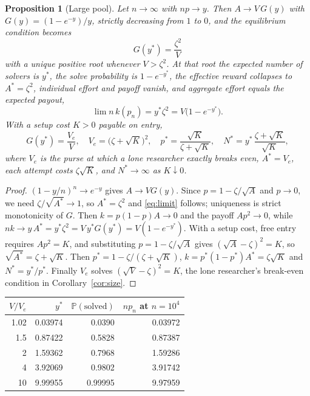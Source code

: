 \documentclass[11pt]{article}
\theoremstyle{itheads}
\newtheorem{proposition}{Proposition}
\newcommand{\PP}{\mathbb{P}}
\begin{document}
\begin{proposition}[Large pool]\label{prop:eqlimit}
Let $n\to\infty$ with $np\to y$. Then $A\to V\,G(y)$ with
$G(y)=(1-e^{-y})/y$, strictly decreasing from $1$ to $0$, and the
equilibrium condition becomes
\begin{equation}
\boxed{\;G(y^{*})=\frac{\zeta^{2}}{V}\;}
\label{eq:limit}
\end{equation}
with a unique positive root whenever $V>\zeta^{2}$. At that root the
expected number of solvers is $y^{*}$, the solve probability is
$1-e^{-y^{*}}$, the effective reward collapses to $A^{*}=\zeta^{2}$,
individual effort and payoff vanish, and aggregate effort equals the
expected payout,
\begin{equation}
\lim n\,k(p_{n})=y^{*}\zeta^{2}=V\big(1-e^{-y^{*}}\big).
\end{equation}
With a setup cost $K>0$ payable on entry,
\begin{equation}
G(y^{*})=\frac{V_{e}}{V},
\quad
V_{e}=\big(\zeta+\sqrt K\big)^{2},
\quad
p^{*}=\frac{\sqrt K}{\zeta+\sqrt K},
\quad
N^{*}=y^{*}\,\frac{\zeta+\sqrt K}{\sqrt K},
\end{equation}
where $V_{e}$ is the purse at which a lone researcher exactly breaks even,
$A^{*}=V_{e}$, each attempt costs $\zeta\sqrt K$, and $N^{*}\to\infty$ as
$K\downarrow0$.
\end{proposition}

\begin{proof}
$(1-y/n)^{n}\to e^{-y}$ gives $A\to VG(y)$. Since $p=1-\zeta/\sqrt A$ and
$p\to0$, we need $\zeta/\sqrt{A^{*}}\to1$, so $A^{*}=\zeta^{2}$ and
\eqref{eq:limit} follows; uniqueness is strict monotonicity of $G$. Then
$k=p(1-p)A\to0$ and the payoff $Ap^{2}\to0$, while
$nk\to y\,A^{*}=y^{*}\zeta^{2}=V\,y^{*}G(y^{*})=V(1-e^{-y^{*}})$. With a
setup cost, free entry requires $Ap^{2}=K$, and substituting
$p=1-\zeta/\sqrt A$ gives $(\sqrt A-\zeta)^{2}=K$, so
$\sqrt{A^{*}}=\zeta+\sqrt K$. Then $p^{*}=1-\zeta/(\zeta+\sqrt K)$,
$k=p^{*}(1-p^{*})A^{*}=\zeta\sqrt K$ and $N^{*}=y^{*}/p^{*}$. Finally
$V_{e}$ solves $(\sqrt V-\zeta)^{2}=K$, the lone researcher's break-even
condition in Corollary~\ref{cor:size}.
\end{proof}

\begin{center}
\begin{tabular}{rrrr}
\toprule
$V/V_{e}$ & $y^{*}$ & $\PP(\text{solved})$ & $n p_{n}$ at $n=10^{4}$\\
\midrule
1.02 & 0.03974 & 0.0390 & 0.03972\\
1.5  & 0.87422 & 0.5828 & 0.87387\\
2    & 1.59362 & 0.7968 & 1.59286\\
4    & 3.92069 & 0.9802 & 3.91742\\
10   & 9.99955 & 0.99995& 9.97959\\
\bottomrule
\end{tabular}
\end{center}
\end{document}
